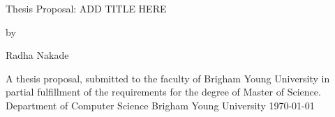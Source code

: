 \pagestyle{empty}


\begin{center}
\begin{Huge}
Thesis Proposal:
\linebreak
ADD TITLE HERE
\linebreak
\end{Huge}

by \linebreak \linebreak \linebreak \linebreak

\begin{huge}
Radha Nakade
\linebreak 
\linebreak 
\linebreak 
\linebreak 
\end{huge}

\begin{large}

A thesis proposal, submitted to the faculty of Brigham Young University in
partial fulfillment of the requirements for the degree of Master of Science.
\linebreak 
\linebreak 
\linebreak 
\linebreak 
Department of
Computer Science 
\linebreak 
\linebreak 
Brigham Young University
\linebreak 
\linebreak 
\today
\linebreak 
\linebreak

\end{large}


\end{center}
\pagebreak
